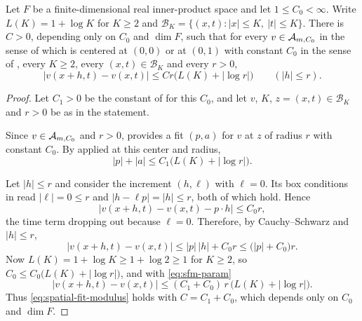 \begin{lemma}
Let $F$ be a finite-dimensional real inner-product space and let
$1\le C_0<\infty$. Write $L(K)=1+\log K$ for $K\ge2$ and
$\mathcal B_K=\{(x,t):|x|\le K,\ |t|\le K\}$. There is $C>0$, depending only on
$C_0$ and $\dim F$, such that for every $v\in\mathcal{A}_{m,C_0}$ in the sense of
 which is centered at $(0,0)$ or at $(0,1)$ with constant
$C_0$ in the sense of , every $K\ge2$, every
$(x,t)\in\mathcal B_K$ and every $r>0$,
\begin{equation}\label{eq:spatial-fit-modulus}
  |v(x+h,t)-v(x,t)|\le Cr\bigl(L(K)+|\log r|\bigr)\qquad(|h|\le r).
\end{equation}
\end{lemma}
\begin{proof}
Let $C_1>0$ be the constant of  for this $C_0$, and
let $v$, $K$, $z=(x,t)\in\mathcal B_K$ and $r>0$ be as in the statement.

Since $v\in\mathcal{A}_{m,C_0}$ and $r>0$,  provides a fit
$(p,a)$ for $v$ at $z$ of radius $r$ with constant $C_0$. By
 applied at this center and radius,
\begin{equation}\label{eq:sfm-param}
  |p|+|a|\le C_1\bigl(L(K)+|\log r|\bigr).
\end{equation}

Let $|h|\le r$ and consider the increment $(h,\ell)$ with $\ell=0$. Its box
conditions in  read $|\ell|=0\le r$ and $|h-\ell p|=|h|\le r$,
both of which hold. Hence
\[
  \bigl|v(x+h,t)-v(x,t)-p\cdot h\bigr|\le C_0r ,
\]
the time term dropping out because $\ell=0$. Therefore, by Cauchy--Schwarz and
$|h|\le r$,
\[
  |v(x+h,t)-v(x,t)|\le|p|\,|h|+C_0r\le\bigl(|p|+C_0\bigr)r .
\]
Now $L(K)=1+\log K\ge1+\log2\ge1$ for $K\ge2$, so
$C_0\le C_0\bigl(L(K)+|\log r|\bigr)$, and with \eqref{eq:sfm-param}
\[
  |v(x+h,t)-v(x,t)|\le(C_1+C_0)\,r\,\bigl(L(K)+|\log r|\bigr).
\]
Thus \eqref{eq:spatial-fit-modulus} holds with $C=C_1+C_0$, which depends only
on $C_0$ and $\dim F$.
\end{proof}
